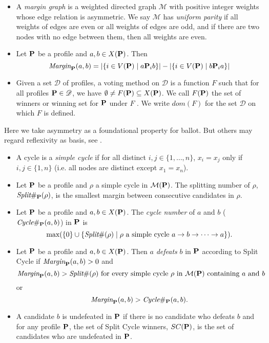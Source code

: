 \begin{definition}
\begin{itemize}
        \item A \emph{margin graph} is a weighted directed graph $\mathcal{M}$ with positive integer weights whose edge relation is asymmetric. We say $\mathcal{M}$ has \emph{uniform parity} if all weights of edges are even or all weights of edges are odd, and if there are two nodes with no edge between them, then all weights are even.
        \item Let $\mathbf{P}$ be a profile and $a,b \in X(\mathbf{P})$. Then 
        \[\textit{Margin}_{\mathbf{P}} (a,b) = |\{i \in V(\mathbf{P})\;|\; a \mathbf{P}_i b\}| - |\{i \in V(\mathbf{P})\;|\; b \mathbf{P}_i a\}|\]
        \item Given a set $\mathscr{D}$ of profiles, a voting method on $\mathscr{D}$ is a function $F$ such that for all profiles $\mathbf{P} \in \mathscr{D}$, we have $\emptyset \neq F(\mathbf{P}) \subseteq X(\mathbf{P})$. We call $F(\mathbf{P})$ the set of winners or winning set for $\mathbf{P}$ under $F$ . We write $dom(F )$ for the set $\mathscr{D}$ on which $F$ is defined.
    \end{itemize}
\end{definition}

\begin{remark}
    Here we take asymmetry as a foundational property for ballot. But others may regard reflexivity as basis, see \textcite{Heitzig2002}.
\end{remark}

\begin{definition}
    \begin{itemize}
        \item A cycle is a \emph{simple cycle} if for all distinct $i,j \in \{1,\dots,n\}$, $x_i = x_j$ only if $i,j \in \{1,n\}$ (i.e. all nodes are distinct except $x_1 = x_n$).
        \item Let $\mathbf{P}$ be a profile and $\rho$ a simple cycle in $\mathcal{M}(\mathbf{P})$. The splitting number of $\rho$, $\textit{Split}\#_{\mathbf{P}}(\rho)$, is the smallest margin between consecutive candidates in $\rho$.
        \item Let $\mathbf{P}$ be a profile and $a, b \in X(\mathbf{P})$. The \emph{cycle number} of $a$ and $b$ ($\textit{Cycle}\#_{\mathbf{P}} (a,b)$) in $\mathbf{P}$ is
        \[\mbox{max}(\{0\} \cup \{\textit{Split}\#(\rho)\;|\;\rho \mbox{ a simple cycle } a \to b \to \dots \to a \}).\]
        \item Let $\mathbf{P}$ be a profile and $a,b \in X(\mathbf{P})$. Then $a$ \emph{defeats} $b$ in $\mathbf{P}$ according to Split Cycle if $\textit{Margin}_{\mathbf{P}}(a,b) > 0$ and 
        \[\Margin_\profile(a,b) > \splitnum(\rho)\ \mbox{for every simple cycle}\ \rho\ \mbox{in}\ \mathcal{M}(\profile) \mbox{ containing } a \mbox{ and } b\]
        or
        \[\textit{Margin}_{\mathbf{P}}(a,b) > \textit{Cycle}\#_{\mathbf{P}} (a,b).\]
        \item A candidate $b$ is undefeated in $\mathbf{P}$ if there is no candidate who defeats $b$ and for any profile $\mathbf{P}$, the set of Split Cycle winners, $SC(\mathbf{P})$, is the set of candidates who are undefeated in $\mathbf{P}$.
    \end{itemize}
\end{definition}

